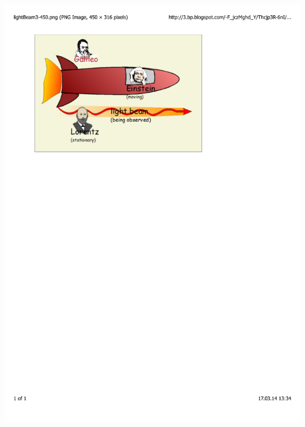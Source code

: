 \documentclass[mathserif,8pt]{beamer}
\begin{document}
\begin{frame}
\begin{columns}
\begin{column}{.40\textwidth}
	\includegraphics[viewport = 70 550 390 770, clip, scale=0.3]{figures/light_beam.pdf}
	\ \\
    \end{column}
    \end{columns}
\end{frame}
\end{document}
